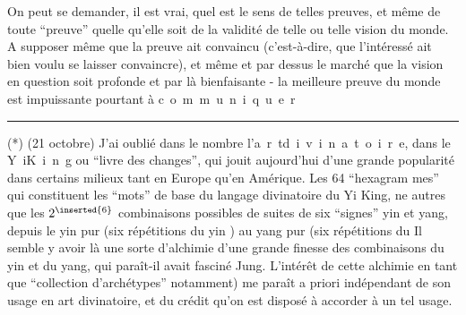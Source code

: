 On peut se demander, il est vrai, quel est le sens de telles preuves, et
même de toute ``preuve'' quelle qu'elle soit de la validité de telle ou telle
vision du monde. A supposer même que la preuve ait convaincu (c'est-à-dire,
que l'intéressé ait bien voulu se laisser convaincre), et même et par dessus
le marché\unsure{\inserted{,}} que la vision en question soit profonde et par là\unsure{\inserted{,}} bienfaisante -
la meilleure preuve du monde est impuissante pourtant à \mbox{c o m m u n i q u e r}
\par\noindent\rule{0.24\linewidth}{0.3pt}\par
(*) (21 octobre) J'ai oublié dans le nombre l'\mbox{a r t\quad d i v i n a t o i r e},
dans le \mbox{Y i\quad K i n g} ou ``livre des changes'', qui jouit aujourd'hui d'une grande
popularité dans certains milieux tant en Europe qu'en Amérique. Les \unsure{$\cdot$}64 ``hexagram\unsure{-}
mes'' qui constituent les ``mots'' de base du langage divinatoire du Yi King, ne 
autres que les $2^{\inserted{6}}$ combinaisons possibles de suites de six ``signes'' yin et yang,
depuis le yin pur (six répétitions du yin ) au yang pur (six répétitions du 
Il semble y avoir là une sorte d'alchimie d'une grande finesse des combinaisons
du yin et du yang, qui \inserted{(}paraît-il\inserted{)} avait fasciné Jung. L'intérêt de cette alchimie
\inserted{(}en tant que ``collection d'archétypes'' notamment) me paraît a priori indépendant
de son usage en art divinatoire, et du crédit qu'on est disposé à accorder à
un tel usage.

